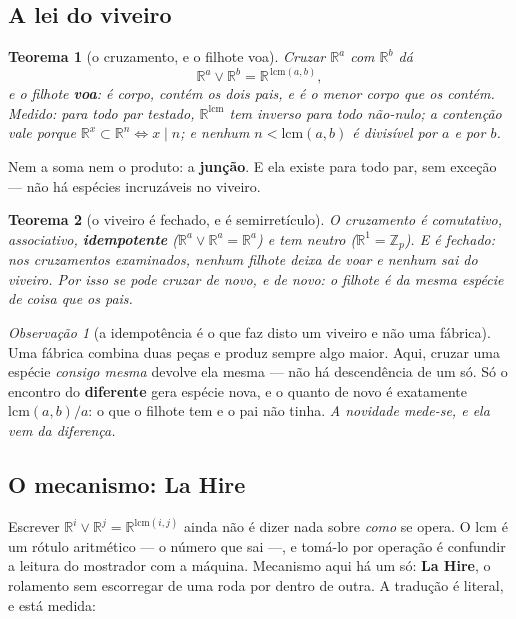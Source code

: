 \documentclass[11pt]{article}
\newcommand{\Z}{\mathbb Z}
\newcommand{\R}{\mathbb R}
\theoremstyle{plain}
\newtheorem{teorema}{Teorema}
\theoremstyle{remark}
\newtheorem{obs}{Observação}
\begin{document}
\subsection{A lei do viveiro}

\begin{teorema}[o cruzamento, e o filhote voa]
Cruzar $\R^a$ com $\R^b$ dá
\[
 \R^a\vee\R^b=\R^{\,\mathrm{lcm}(a,b)},
\]
e o filhote \textbf{voa}: é corpo, contém os dois pais, e é o \emph{menor} corpo que os contém.
Medido: para todo par testado, $\R^{\mathrm{lcm}}$ tem inverso para todo não-nulo; a contenção vale
porque $\R^x\subset\R^n\iff x\mid n$; e nenhum $n<\mathrm{lcm}(a,b)$ é divisível por $a$ e por $b$.
\end{teorema}

\noindent Nem a soma nem o produto: a \textbf{junção}. E ela existe para todo par, sem exceção --- não
há espécies incruzáveis no viveiro.

\begin{teorema}[o viveiro é fechado, e é semirretículo]
O cruzamento é comutativo, associativo, \textbf{idempotente} ($\R^a\vee\R^a=\R^a$) e tem neutro
($\R^1=\Z_p$). E é fechado: nos cruzamentos examinados, nenhum filhote deixa de voar e nenhum sai do
viveiro. Por isso se pode cruzar de novo, e de novo: o filhote é da mesma espécie de coisa que os
pais.
\end{teorema}

\begin{obs}[a idempotência é o que faz disto um viveiro e não uma fábrica]
Uma fábrica combina duas peças e produz sempre algo maior. Aqui, cruzar uma espécie \emph{consigo
mesma} devolve ela mesma --- não há descendência de um só. Só o encontro do \textbf{diferente} gera
espécie nova, e o quanto de novo é exatamente $\mathrm{lcm}(a,b)/a$: o que o filhote tem e o pai não
tinha. \emph{A novidade mede-se, e ela vem da diferença.}
\end{obs}

\subsection{O mecanismo: La Hire}

Escrever $\R^i\vee\R^j=\R^{\mathrm{lcm}(i,j)}$ ainda não é dizer nada sobre \emph{como} se opera. O
$\mathrm{lcm}$ é um rótulo aritmético --- o número que sai ---, e tomá-lo por operação é confundir a
leitura do mostrador com a máquina. Mecanismo aqui há um só: \textbf{La Hire}, o rolamento sem
escorregar de uma roda por dentro de outra. A tradução é literal, e está medida:
\end{document}

